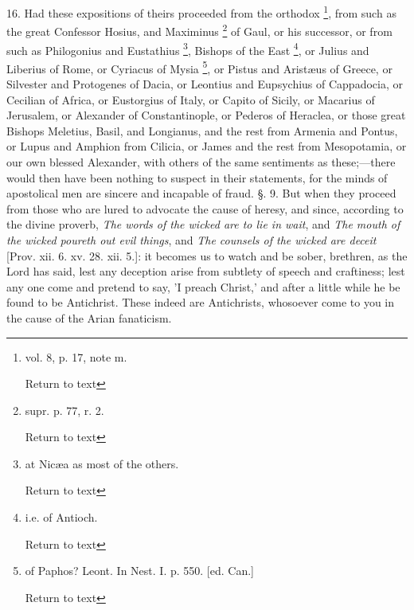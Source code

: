 16. Had these expositions of theirs proceeded
from the orthodox \footnote{vol. 8, p. 17, note m.

Return to text},
from such as the great Confessor Hosius, and Maximinus \footnote{supr. p. 77, r. 2.

Return to text} of Gaul, or his successor, or from such as Philogonius and
Eustathius \footnote{at Nicæa as most of the others.

Return to text}, Bishops
of the East \footnote{i.e. of Antioch.

Return to text}, or
Julius and Liberius of Rome, or Cyriacus of Mysia \footnote{of Paphos? Leont. In Nest. I. p. 550. [ed. Can.]

Return to text}, or Pistus and Aristæus of Greece, or Silvester and
Protogenes of Dacia, or Leontius and Eupsychius of Cappadocia, or
Cecilian of Africa, or Eustorgius of Italy, or Capito of Sicily, or
Macarius of Jerusalem, or Alexander of Constantinople, or Pederos of
Heraclea, or those great Bishops Meletius, Basil, and Longianus, and
the rest from Armenia and Pontus, or Lupus and Amphion from Cilicia,
or James and the rest from Mesopotamia, or our own blessed Alexander,
with others of the same sentiments as these;—there would then
have been nothing to suspect in their statements, for the minds of
apostolical men are sincere and incapable of fraud. §. 9. But when
they proceed from those who are lured to advocate the cause of heresy,
and since, according to the divine proverb, \emph{The words of the wicked
are to lie in wait}, and \emph{The mouth of the wicked poureth out
evil things}, and \emph{The counsels of the wicked are deceit} [Prov.
xii. 6. xv. 28. xii. 5.]: it becomes us to watch and be sober,
brethren, as the Lord has said, lest any deception arise from subtlety
of speech and craftiness; lest any one come and pretend to say, 'I
preach Christ,' and after a little while he be found to be Antichrist.
These indeed are Antichrists, whosoever come to you in the cause of
the Arian fanaticism.

